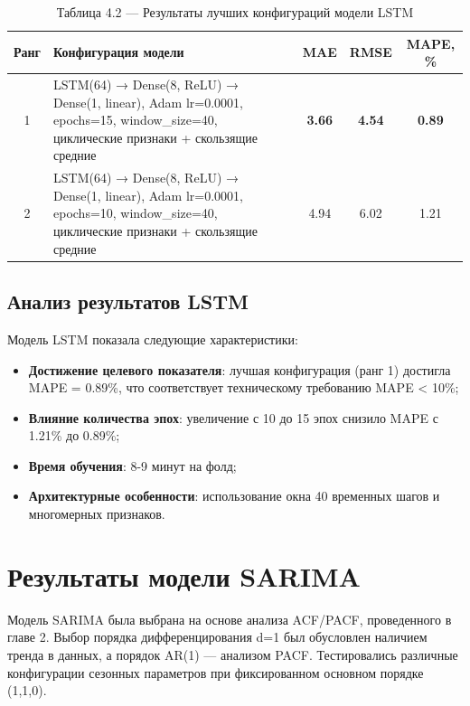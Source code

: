 \begin{table}[H]
	\centering
	\caption*{Таблица 4.2 --- Результаты лучших конфигураций модели LSTM}
	\begin{tabular}{|c|p{8cm}|c|c|c|}
		\hline
		\textbf{Ранг} & \textbf{Конфигурация модели} & \textbf{MAE} & \textbf{RMSE} & \textbf{MAPE, \%} \\
		\hline
		1 & LSTM(64) → Dense(8, ReLU) → Dense(1, linear), Adam lr=0.0001, epochs=15, window\_size=40, циклические признаки + скользящие средние & \textbf{3.66} & \textbf{4.54} & \textbf{0.89} \\
		\hline
		2 & LSTM(64) → Dense(8, ReLU) → Dense(1, linear), Adam lr=0.0001, epochs=10, window\_size=40, циклические признаки + скользящие средние & 4.94 & 6.02 & 1.21 \\
		\hline
	\end{tabular}
	\label{tab:lstm_results}
\end{table}

\subsection{Анализ результатов LSTM}

\hspace*{1.25cm}Модель LSTM показала следующие характеристики:

\begin{itemize}
	\item \textbf{Достижение целевого показателя}: лучшая конфигурация (ранг 1) достигла MAPE = 0.89\%, что соответствует техническому требованию MAPE < 10\%;
	\item \textbf{Влияние количества эпох}: увеличение с 10 до 15 эпох снизило MAPE с 1.21\% до 0.89\%;
	\item \textbf{Время обучения}: 8-9 минут на фолд;
	\item \textbf{Архитектурные особенности}: использование окна 40 временных шагов и многомерных признаков.
\end{itemize}

\section{Результаты модели SARIMA}
\label{sec:sarima_results}

\hspace*{1.25cm}Модель SARIMA была выбрана на основе анализа ACF/PACF, проведенного в главе 2. Выбор порядка дифференцирования d=1 был обусловлен наличием тренда в данных, а порядок AR(1) — анализом PACF. Тестировались различные конфигурации сезонных параметров при фиксированном основном порядке (1,1,0).

